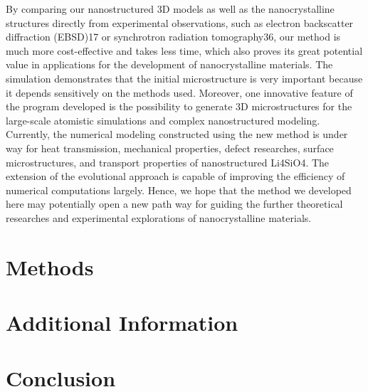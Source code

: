 \documentclass{article}
\begin{document}
By comparing our nanostructured 3D models as well as the nanocrystalline structures directly from experimental observations, such as electron backscatter diffraction (EBSD)17 or synchrotron radiation tomography36, our method is much more cost-effective and takes less time, which also proves its great potential value in applications for the development of nanocrystalline materials. The simulation demonstrates that the initial microstructure is very important because it depends sensitively on the methods used. Moreover, one innovative feature of the program developed is the possibility to generate 3D microstructures for the large-scale atomistic simulations and complex nanostructured modeling. Currently, the numerical modeling constructed using the new method is under way for heat transmission, mechanical properties, defect researches, surface microstructures, and transport properties of nanostructured Li4SiO4. The extension of the evolutional approach is capable of improving the efficiency of numerical computations largely. Hence, we hope that the method we developed here may potentially open a new path way for guiding the further theoretical researches and experimental explorations of nanocrystalline materials.

\section{Methods}

\section{Additional Information}

\section{Conclusion}
\end{document}
